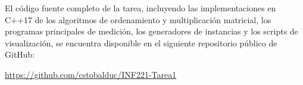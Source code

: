 El código fuente completo de la tarea, incluyendo las implementaciones en C++17 de los algoritmos de ordenamiento y multiplicación matricial, los programas principales de medición, los generadores de instancias y los scripts de visualización, se encuentra disponible en el siguiente repositorio público de GitHub:

\begin{center}
    \url{https://github.com/cstobalduc/INF221-Tarea1} %
\end{center}